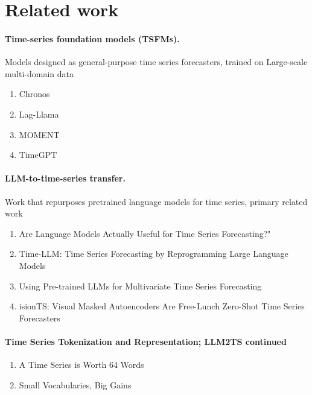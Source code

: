 
\section{Related work}
\label{sec:related_work}

\paragraph{Time-series foundation models (TSFMs).}
Models designed as general-purpose time series forecasters, trained on Large-scale multi-domain data
\begin{enumerate}
    \item Chronos \citep{}
    \item Lag-Llama \citep{}
    \item MOMENT \citep{}
    \item TimeGPT \citep{}
\end{enumerate}

\paragraph{LLM-to-time-series transfer.} 
Work that repurposes pretrained language models for time series, primary related work
\begin{enumerate}
    \item Are Language Models Actually Useful for Time Series Forecasting?" \citep{tan2024languagemodelsactuallyuseful}
    \item Time-LLM: Time Series Forecasting by Reprogramming Large Language Models \citep{jin2024timellmtimeseriesforecasting}
    \item Using Pre-trained LLMs for Multivariate Time Series Forecasting \citep{wolff2025usingpretrainedllmsmultivariate}
    \item isionTS: Visual Masked Autoencoders Are Free-Lunch Zero-Shot Time Series Forecasters \citep{chen2024visionts}
\end{enumerate}

\paragraph{Time Series Tokenization and Representation; LLM2TS continued}
\begin{enumerate}
    \item A Time Series is Worth 64 Words \citep{nie2023timeseriesworth64}
    \item Small Vocabularies, Big Gains \citep{roger2025smallvocabulariesbiggains}
\end{enumerate}

